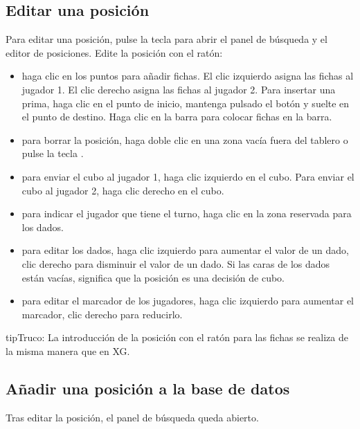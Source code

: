 \documentclass[letterpaper,10pt,spanish]{sphinxmanual}
\begin{document}
\subsection{Editar una posición}
\label{\detokenize{guide_utilisateur:editer-une-position}}\label{\detokenize{guide_utilisateur:guide-edit-position}}
\sphinxAtStartPar
Para editar una posición, pulse la tecla  para abrir el panel de búsqueda y el editor de posiciones. Edite la posición con el ratón:
\begin{itemize}
\item {} 
\sphinxAtStartPar
haga clic en los puntos para añadir fichas. El clic izquierdo asigna las fichas al jugador 1. El clic derecho asigna las fichas al jugador 2. Para insertar una prima, haga clic en el punto de inicio, mantenga pulsado el botón y suelte en el punto de destino. Haga clic en la barra para colocar fichas en la barra.

\item {} 
\sphinxAtStartPar
para borrar la posición, haga doble clic en una zona vacía fuera del tablero o pulse la tecla .

\item {} 
\sphinxAtStartPar
para enviar el cubo al jugador 1, haga clic izquierdo en el cubo. Para enviar el cubo al jugador 2, haga clic derecho en el cubo.

\item {} 
\sphinxAtStartPar
para indicar el jugador que tiene el turno, haga clic en la zona reservada para los dados.

\item {} 
\sphinxAtStartPar
para editar los dados, haga clic izquierdo para aumentar el valor de un dado, clic derecho para disminuir el valor de un dado. Si las caras de los dados están vacías, significa que la posición es una decisión de cubo.

\item {} 
\sphinxAtStartPar
para editar el marcador de los jugadores, haga clic izquierdo para aumentar el marcador, clic derecho para reducirlo.

\end{itemize}

\begin{sphinxadmonition}{tip}{Truco:}
\sphinxAtStartPar
La introducción de la posición con el ratón para las fichas se realiza de la misma manera que en XG.
\end{sphinxadmonition}


\subsection{Añadir una posición a la base de datos}
\label{\detokenize{guide_utilisateur:ajouter-une-position-a-la-base-de-donnees}}
\sphinxAtStartPar
Tras editar la posición, el panel de búsqueda queda abierto.
\end{document}
